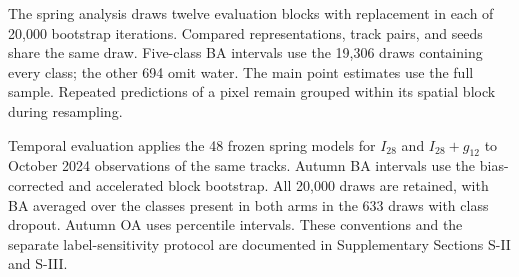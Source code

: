 The spring analysis draws twelve evaluation blocks with replacement in each of 20,000 bootstrap iterations. Compared representations, track pairs, and seeds share the same draw. Five-class BA intervals use the 19,306 draws containing every class; the other 694 omit water. The main point estimates use the full sample. Repeated predictions of a pixel remain grouped within its spatial block during resampling.

Temporal evaluation applies the 48 frozen spring models for $I_{28}$ and $I_{28}+g_{12}$ to October 2024 observations of the same tracks. Autumn BA intervals use the bias-corrected and accelerated block bootstrap. All 20,000 draws are retained, with BA averaged over the classes present in both arms in the 633 draws with class dropout. Autumn OA uses percentile intervals. These conventions and the separate label-sensitivity protocol are documented in Supplementary Sections S-II and S-III.
